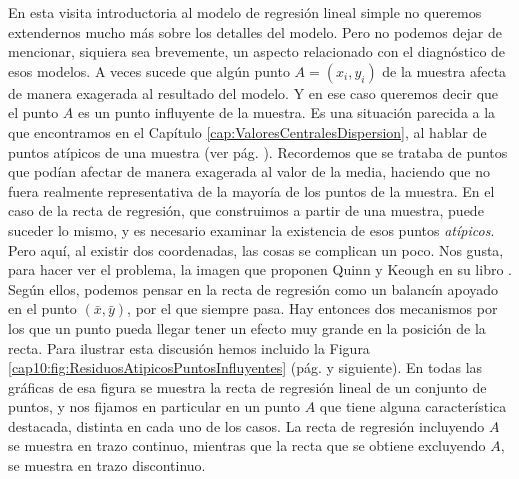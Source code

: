 En esta visita introductoria al modelo de regresión lineal simple no queremos extendernos mucho más sobre los detalles del modelo. Pero no podemos dejar de mencionar, siquiera sea brevemente, un aspecto relacionado con el diagnóstico de esos modelos. A veces sucede que algún punto $A=(x_i,y_i)$  de la muestra afecta de manera exagerada al resultado del modelo. Y en ese caso queremos decir que el punto $A$ es un {\sf punto influyente} de la muestra. Es una situación parecida a la que encontramos en el Capítulo \ref{cap:ValoresCentralesDispersion}, al hablar de puntos atípicos de una muestra (ver pág. \pageref{cap02:subsubsec:RangoIntercuartilico}). Recordemos que se trataba de puntos que podían afectar de manera exagerada al valor de la media, haciendo que no fuera realmente representativa de la mayoría de los puntos de la muestra.  En el caso de la recta de regresión, que construimos a partir de una muestra, puede suceder lo mismo, y es necesario examinar la existencia de esos puntos {\em atípicos}. Pero aquí, al existir dos coordenadas, las cosas se complican un poco. Nos gusta, para hacer ver el problema, la imagen que proponen Quinn y Keough en su libro \cite{quinn2002experimental}. Según ellos, podemos pensar en la recta de regresión como un balancín apoyado en el punto $(\bar x,\bar y)$, por el que siempre pasa. Hay entonces dos mecanismos por los que un punto pueda llegar tener un efecto muy grande en la posición de la recta. Para ilustrar esta discusión hemos incluido la Figura \ref{cap10:fig:ResiduosAtipicosPuntosInfluyentes} (pág. \pageref{cap10:fig:ResiduosAtipicosPuntosInfluyentes} y siguiente). En todas las gráficas de esa figura se muestra la recta de regresión lineal de un conjunto de puntos, y nos fijamos en particular en un punto $A$ que tiene alguna característica destacada, distinta en cada uno de los casos. La recta de regresión incluyendo $A$ se muestra en trazo continuo, mientras que  la recta que se obtiene excluyendo $A$, se muestra en trazo discontinuo.

